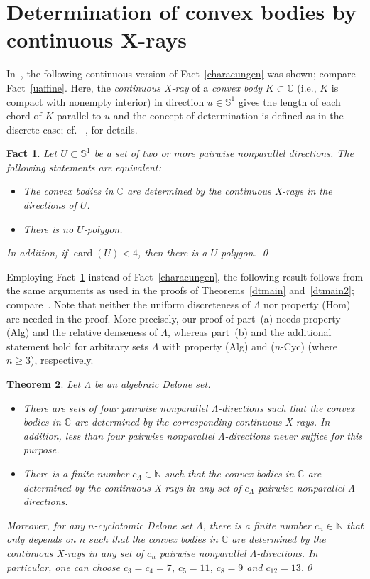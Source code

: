 \documentclass[a4paper]{amsart}
\newtheorem{theorem}{Theorem}[section]
\newtheorem{fact}[theorem]{Fact}
\theoremstyle{definition}
\numberwithin{equation}{section}
\numberwithin{theorem}{section}
\begin{document}
\section{Determination of convex bodies by continuous X-rays}

In~\cite{GM}, the following continuous version of
Fact~\ref{characungen} was
shown;  compare Fact~\ref{uaffine}. Here, the {\em continuous X-ray} of a
{\em convex body\/} $K\subset{\mathbb{C}}$ (i.e., $K$ is compact with nonempty interior) in direction $u\in\mathbb{S}^1$ gives the length of
each chord of $K$ parallel to $u$ and the concept of determination is
defined as in the discrete case; cf.~ \cite{G}, \cite{GM} for details. 

\begin{fact}\label{characuncont}
Let $U\subset\mathbb{S}^{1}$ be a set of two or more pairwise nonparallel directions. The following statements are equivalent:
\begin{itemize}
\item[(i)]
The convex bodies in ${\mathbb{C}}$ are determined by the continuous X-rays in the directions of $U$.
\item[(ii)]
There is no $U$-polygon.
\end{itemize}
In addition, if $\operatorname{card}(U)<4$, then there is a $U$-polygon.  \qed
\end{fact}

Employing Fact~\ref{characuncont} instead of Fact~\ref{characungen},
the following result follows from the same arguments as used in the proofs
of  Theorems~\ref{dtmain} and~\ref{dtmain2};
compare~\cite[Thm. 6.2]{GG}. Note that neither the uniform
discreteness of $\varLambda$ nor property (Hom) 
are needed in the proof. More precisely, our proof of part~(a) needs property (Alg)
and the relative denseness of $\varLambda$, whereas part~(b) and the
additional statement 
hold for arbitrary sets $\varLambda$ with property (Alg) and
($n$-Cyc) (where $n\geq 3$), respectively. 

\begin{theorem}\label{tmain}
Let $\varLambda$ be an algebraic Delone set.
\begin{itemize}
\item[(a)]
There are sets of four pairwise nonparallel $\varLambda$-directions
such that the convex bodies in ${\mathbb{C}}$ are determined by the
corresponding continuous 
X-rays. In addition, less than four pairwise nonparallel $\varLambda$-directions never
suffice for this purpose.
\item[(b)]
There is a finite number $c_{\varLambda}\in{\mathbb{N}}$ such that the convex
bodies in ${\mathbb{C}}$ are determined by the continuous X-rays in any set of $c_{\varLambda}$
pairwise nonparallel $\varLambda$-directions. 
\end{itemize}
Moreover, for any
$n$-cyclotomic Delone set $\varLambda$, there is a finite number
$c_n\in{\mathbb{N}}$ that only depends on $n$ such that the convex
bodies in ${\mathbb{C}}$ are determined by the continuous X-rays in any set of $c_n$
pairwise nonparallel $\varLambda$-directions. In particular, one can choose $c_3=c_4=7$, $c_5=11$, $c_8=9$ and $c_{12}=13$.\qed
\end{theorem}
\end{document}
